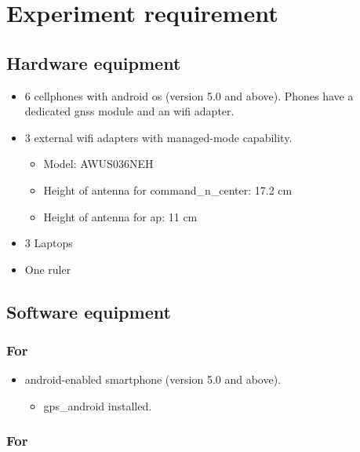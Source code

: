 \section{Experiment requirement}\label{experiment-requirement}

\subsection{Hardware equipment}\label{hardware-equipment}

\begin{itemize}
\tightlist
\item
  6 cellphones with \gls{android} \acrshort{os} (version 5.0 and above). Phones have a dedicated \gls{gnss} module and an \gls{wifi} adapter.
\item
  3 external \gls{wifi} adapters with managed-mode capability.

  \begin{itemize}
  \tightlist
  \item
    Model: AWUS036NEH
  \item
    Height of antenna  for \gls{command_n_center}: 17.2 cm
  \item
    Height of antenna  for \acrshort{ap}: 11 cm
  \end{itemize}
\item
  3 Laptops
\item
  One ruler
\end{itemize}

\subsection{Software equipment}\label{software-equipment}

\subsubsection{For  }

\begin{itemize}
\tightlist
\item
  \gls{android}-enabled smartphone (version 5.0 and above).

  \begin{itemize}
  \tightlist
  \item
  	\Gls{gps_android} installed.
    \end{itemize}
\end{itemize}

\subsubsection{For  }\label{for-command-center-cnc}

